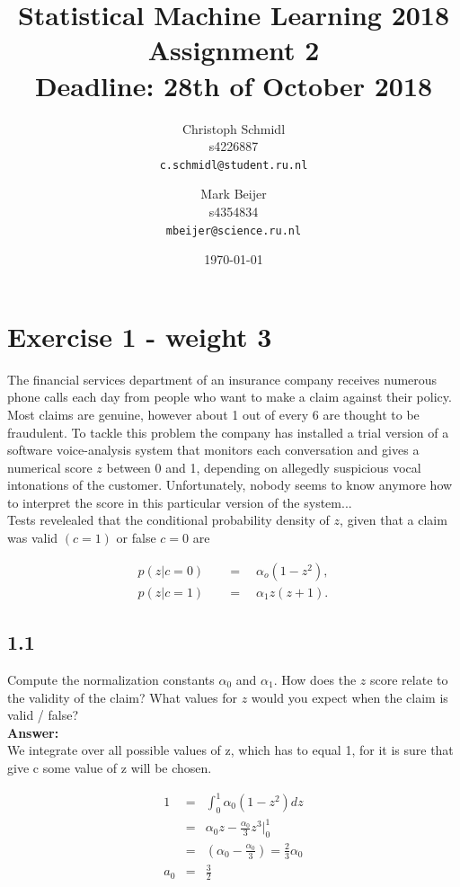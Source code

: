 \documentclass[a4paper]{article}
\title{Statistical Machine Learning 2018\\Assignment 2\\Deadline: 28th of October 2018}
\author{
  Christoph Schmidl\\ s4226887\\      \texttt{c.schmidl@student.ru.nl}
  \and
  Mark Beijer\\ s4354834\\     \texttt{mbeijer@science.ru.nl}
}
\date{\today}
\begin{document}
\maketitle


\section*{Exercise 1 - weight 3}

The financial services department of an insurance company receives numerous phone calls each day from people who want to make a claim against their policy. Most claims are genuine, however about 1 out of every 6 are thought to be fraudulent. To tackle this problem the company has installed a trial version of a software voice-analysis system that monitors each conversation and gives a numerical score $z$ between 0 and 1, depending on allegedly suspicious vocal intonations of the customer. Unfortunately, nobody seems to know anymore how to interpret the score in this particular version of the system...\\

Tests revelealed that the conditional probability density of $z$, given that a claim was valid $(c = 1)$ or false $c = 0$ are 

\begin{align*}
p(z | c = 0) \quad &= \quad \alpha_o(1 - z^2),\\
p(z | c = 1) \quad &= \quad \alpha_1z(z + 1).
\end{align*}



\subsection*{1.1}

Compute the normalization constants $\alpha_0$ and $\alpha_1$. How does the $z$ score relate to the validity of the claim? What values for $z$ would you expect when the claim is valid / false?\\

\textbf{Answer:}\\


We integrate over all possible values of z, which has to equal 1, for it is sure that give c some value of z will be chosen.

\begin{eqnarray}
1&=& \int_0^1 \alpha_0 (1-z^2) dz\\
&=& \alpha_0z - \frac{\alpha_0}{3} z^3\Bigg|_0^1\\
&=& \left (\alpha_0 -\frac{\alpha_0}{3}\right ) = \frac{2 }{3}\alpha_0\\
a_0 &=& \frac{3}{2}
\end{eqnarray}
\end{document}
